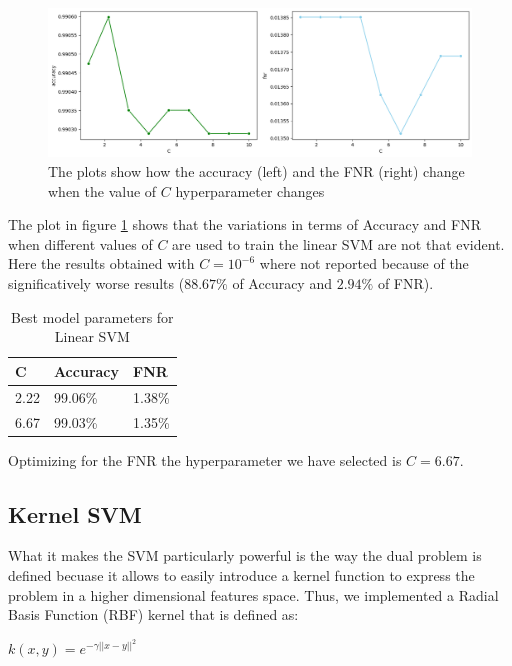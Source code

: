 \documentclass[twocolumn, switch]{article} %
\newcommand\x{0.7}
\begin{document}
\begin{figure}[ht!]
	\centering
	\includegraphics[width=\x\linewidth]{linear_svm_accuracy_fnr.png}
	\caption{The plots show how the accuracy (left) and the FNR (right) change when the value of $C$ hyperparameter changes}
	\label{fig:linearsvm}
\end{figure}

The plot in figure \ref{fig:linearsvm} shows that the variations in terms of Accuracy and FNR when different values of $C$ are used to train the linear SVM are not that evident. Here the results obtained with $C=10^{-6}$ where not reported because of the significatively worse results ($88.67\%$ of Accuracy and $2.94\%$ of FNR). \\

\begin{table}[ht!]
	\centering
	{\small
		\begin{tabular}{|l|l|l|}
			\hline
			\textbf{C} & \textbf{Accuracy} & \textbf{FNR} \\ \hline
			2.22       & 99.06\%           & 1.38\%       \\ \hline
			6.67       & 99.03\%           & 1.35\%       \\ \hline
		\end{tabular}
	}
	\caption{Best model parameters for Linear SVM}
	\vspace{-6mm}
\end{table}

Optimizing for the FNR the hyperparameter we have selected is $C=6.67$.
\subsection{Kernel SVM}
What it makes the SVM particularly powerful is the way the dual problem is defined becuase it allows to easily introduce a kernel function to express the problem in a higher dimensional features space. Thus, we implemented a Radial Basis Function (RBF) kernel that is defined as:
\begin{center}
	$k(x,y) = e^{-\gamma||x-y||^2}$
\end{center}
\end{document}
